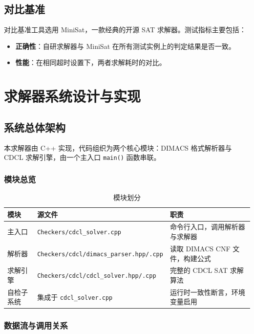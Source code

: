 \documentclass[12pt,a4paper]{article}
\begin{document}
\subsection{对比基准}

对比基准工具选用 MiniSat，一款经典的开源 SAT 求解器。测试指标主要包括：

\begin{itemize}[label=$\bullet$]
    \item \textbf{正确性}：自研求解器与 MiniSat 在所有测试实例上的判定结果是否一致。
    \item \textbf{性能}：在相同超时设置下，两者求解耗时的对比。
\end{itemize}

\section{求解器系统设计与实现}

\subsection{系统总体架构}

本求解器由 C++ 实现，代码组织为两个核心模块：DIMACS 格式解析器与 CDCL 求解引擎，由一个主入口 \texttt{main()} 函数串联。

\subsubsection{模块总览}

\begin{table}[H]
\centering
\renewcommand{\arraystretch}{1.4}
\begin{tabular}{lll}
\toprule
\textbf{模块} & \textbf{源文件} & \textbf{职责} \\
\midrule
主入口 & \texttt{Checkers/cdcl\_solver.cpp}   & 命令行入口，调用解析器与求解器 \\
解析器 & \texttt{Checkers/cdcl/dimacs\_parser.hpp/.cpp} & 读取 DIMACS CNF 文件，构建公式 \\
求解引擎 & \texttt{Checkers/cdcl/cdcl\_solver.hpp/.cpp}   & 完整的 CDCL SAT 求解算法 \\
自检子系统 & 集成于 \texttt{cdcl\_solver.cpp} & 运行时一致性断言，环境变量启用 \\
\bottomrule
\end{tabular}
\caption{模块划分}
\label{tab:modules}
\end{table}

\subsubsection{数据流与调用关系}
\end{document}
